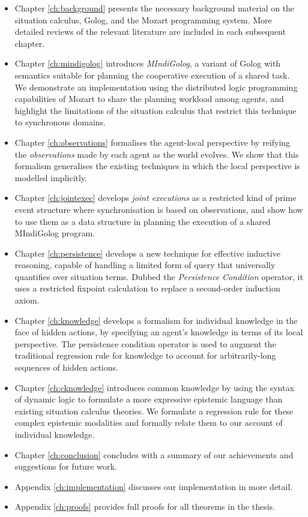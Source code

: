\begin{itemize}
\item Chapter \ref{ch:background} presents the necessary background material
on the situation calculus, Golog, and the Mozart programming system.
More detailed reviews of the relevant literature are included in each
subsequent chapter. 
\item Chapter \ref{ch:mindigolog} introduces \emph{MIndiGolog}, a variant
of Golog with semantics suitable for planning the cooperative execution
of a shared task\emph{.} We demonstrate an implementation using the
distributed logic programming capabilities of Mozart to share the
planning workload among agents, and highlight the limitations of the
situation calculus that restrict this technique to synchronous domains. 
\item Chapter \ref{ch:observations} formalises the agent-local perspective
by reifying the \emph{observations} made by each agent as the world
evolves. We show that this formalism generalises the existing techniques
in which the local perspective is modelled implicitly. 
\item Chapter \ref{ch:jointexec} develops \emph{joint executions} as a
restricted kind of prime event structure where synchronisation is
based on observations, and show how to use them as a data structure
in planning the execution of a shared MIndiGolog program. 
\item Chapter \ref{ch:persistence} develops a new technique for effective
inductive reasoning, capable of handling a limited form of query that
universally quantifies over situation terms. Dubbed the \emph{Persistence
Condition} operator, it uses a restricted fixpoint calculation to
replace a second-order induction axiom. 
\item Chapter \ref{ch:knowledge} develops a formalism for individual knowledge
in the face of hidden actions, by specifying an agent's knowledge
in terms of its local perspective. The persistence condition operator
is used to augment the traditional regression rule for knowledge to
account for arbitrarily-long sequences of hidden actions. 
\item Chapter \ref{ch:cknowledge} introduces common knowledge by using
the syntax of dynamic logic to formulate a more expressive epistemic
language than existing situation calculus theories. We formulate a
regression rule for these complex epistemic modalities and formally
relate them to our account of individual knowledge. 
\item Chapter \ref{ch:conclusion} concludes with a summary of our achievements
and suggestions for future work. 
\item Appendix \ref{ch:implementation} discusses our implementation in
more detail. 
\item Appendix \ref{ch:proofs} provides full proofs for all theorems in
the thesis. 
\end{itemize}
